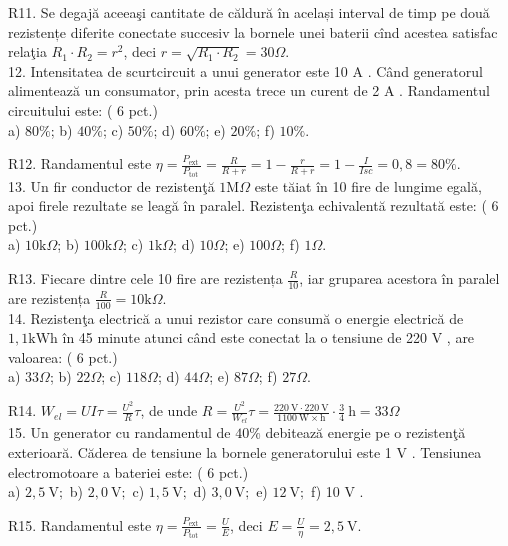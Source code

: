 R11. Se degajă aceeaşi cantitate de căldură în același interval de timp pe două rezistențe diferite conectate succesiv la bornele unei baterii cînd acestea satisfac relaţia $R_{1} \cdot R_{2}=r^{2}$, deci $r=\sqrt{R_{1} \cdot R_{2}}=30 \Omega$.\\
12. Intensitatea de scurtcircuit a unui generator este 10 A . Când generatorul alimentează un consumator, prin acesta trece un curent de 2 A . Randamentul circuitului este: ( 6 pct.)\\
a) $80 \%$; b) $40 \%$; c) $50 \%$; d) $60 \%$; e) $20 \%$; f) $10 \%$.

R12. Randamentul este $\eta=\frac{P_{\text {ext }}}{P_{\text {tot }}}=\frac{R}{R+r}=1-\frac{r}{R+r}=1-\frac{I}{I s c}=0,8=80 \%$.\\
13. Un fir conductor de rezistenţă $1 \mathrm{M} \Omega$ este tăiat în 10 fire de lungime egală, apoi firele rezultate se leagă în paralel. Rezistenţa echivalentă rezultată este: ( 6 pct.)\\
a) $10 \mathrm{k} \Omega$; b) $100 \mathrm{k} \Omega$; c) $1 \mathrm{k} \Omega$; d) $10 \Omega$; e) $100 \Omega$; f) $1 \Omega$.

R13. Fiecare dintre cele 10 fire are rezistența $\frac{R}{10}$, iar gruparea acestora în paralel are rezistența $\frac{R}{100}=10 \mathrm{k} \Omega$.\\
14. Rezistenţa electrică a unui rezistor care consumă o energie electrică de $1,1 \mathrm{kWh}$ în 45 minute atunci când este conectat la o tensiune de 220 V , are valoarea: ( 6 pct.)\\
a) $33 \Omega$; b) $22 \Omega$; c) $118 \Omega$; d) $44 \Omega$; e) $87 \Omega$; f) $27 \Omega$.

R14. $W_{e l}=U I \tau=\frac{U^{2}}{R} \tau$, de unde $R=\frac{U^{2}}{W_{e l}} \tau=\frac{220 \mathrm{~V} \cdot 220 \mathrm{~V}}{1100 \mathrm{~W} \times \mathrm{h}} \cdot \frac{3}{4} \mathrm{~h}=33 \Omega$\\
15. Un generator cu randamentul de $40 \%$ debitează energie pe o rezistenţă exterioară. Căderea de tensiune la bornele generatorului este 1 V . Tensiunea electromotoare a bateriei este: ( 6 pct.)\\
a) $2,5 \mathrm{~V} ;$ b) $2,0 \mathrm{~V} ;$ c) $1,5 \mathrm{~V} ;$ d) $3,0 \mathrm{~V} ;$ e) $12 \mathrm{~V} ;$ f) 10 V .

R15. Randamentul este $\eta=\frac{P_{\text {ext }}}{P_{\text {tot }}}=\frac{U}{E}$, deci $E=\frac{U}{\eta}=2,5 \mathrm{~V}$.

